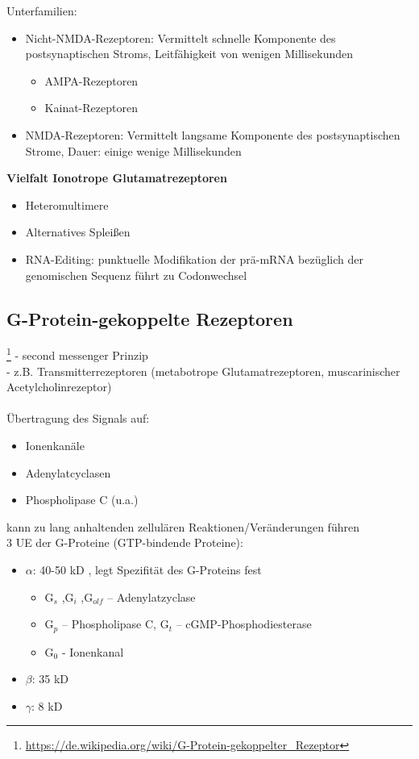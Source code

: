 Unterfamilien:
\begin{itemize}
	\item Nicht-NMDA-Rezeptoren: Vermittelt schnelle Komponente des postsynaptischen Stroms, Leitfähigkeit von wenigen Millisekunden
		\begin{itemize}
			\item AMPA-Rezeptoren
			\item Kainat-Rezeptoren
		\end{itemize}
	\item NMDA-Rezeptoren: Vermittelt langsame Komponente des postsynaptischen Strome, Dauer: einige wenige Millisekunden
\end{itemize}

\textbf{Vielfalt Ionotrope Glutamatrezeptoren}
\begin{itemize}
	\item Heteromultimere
	\item Alternatives Spleißen
	\item RNA-Editing: punktuelle Modifikation der prä-mRNA bezüglich der genomischen Sequenz führt zu Codonwechsel
\end{itemize}

\subsection{G-Protein-gekoppelte Rezeptoren}\footnote{\url{https://de.wikipedia.org/wiki/G-Protein-gekoppelter_Rezeptor}}
 - second messenger Prinzip\\
 - z.B. Transmitterrezeptoren (metabotrope Glutamatrezeptoren, muscarinischer Acetylcholinrezeptor)\\\\
Übertragung des Signals auf:
\begin{itemize}
	\item Ionenkanäle
	\item Adenylatcyclasen
	\item Phospholipase C (u.a.)
\end{itemize}
kann zu lang anhaltenden zellulären Reaktionen/Veränderungen führen\\

3 UE der G-Proteine (GTP-bindende Proteine):
\begin{itemize}
	\item $\alpha$: 40-50 kD , legt Spezifität des G-Proteins fest
		\begin{itemize}
			\item G$_s$ ,G$_i$ ,G$_{olf}$ – Adenylatzyclase
			\item G$_p$ – Phospholipase C, G$_t$ – cGMP-Phosphodiesterase
			\item G$_0$ - Ionenkanal
		\end{itemize}
	\item $\beta$: 35 kD
	\item $\gamma$: 8 kD
\end{itemize}

